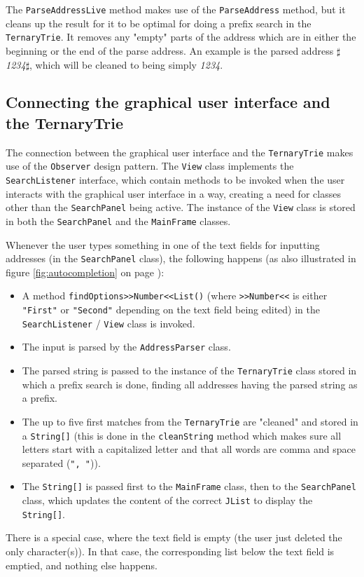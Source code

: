 \documentclass[a4paper,11pt]{article}
\begin{document}
The \texttt{ParseAddressLive} method makes use of the \texttt{ParseAddress} method, but it cleans up the result for it to be optimal for doing a prefix search in the \texttt{TernaryTrie}. It removes any "empty" parts of the address which are in either the beginning or the end of the parse address. An example is the parsed address \textit{$\sharp$1234$\sharp$}, which will be cleaned to being simply \textit{1234}.

\subsection{Connecting the graphical user interface and the TernaryTrie}
The connection between the graphical user interface and the \texttt{TernaryTrie} makes use of the \texttt{Observer} design pattern. The \texttt{View} class implements the \texttt{SearchListener} interface, which contain methods to be invoked when the user interacts with the graphical user interface in a way, creating a need for classes other than the \texttt{SearchPanel} being active. The instance of the \texttt{View} class is stored in both the \texttt{SearchPanel} and the \texttt{MainFrame} classes.

Whenever the user types something in one of the text fields for inputting addresses (in the \texttt{SearchPanel} class), the following happens (as also illustrated in figure \ref{fig:autocompletion} on page \pageref{fig:autocompletion}):
\begin{itemize}
	\item A method \texttt{findOptions>>Number<<List()} (where \texttt{>>Number<<} is either \texttt{"First"} or \texttt{"Second"} depending on the text field being edited) in the \texttt{SearchListener} / \texttt{View} class is invoked.
	\item The input is parsed by the \texttt{AddressParser} class.
	\item The parsed string is passed to the instance of the \texttt{TernaryTrie} class stored in which a prefix search is done, finding all addresses having the parsed string as a prefix.
	\item The up to five first matches from the \texttt{TernaryTrie} are "cleaned" and stored in a \texttt{String[]} (this is done in the \texttt{cleanString} method which makes sure all letters start with a capitalized letter and that all words are comma and space separated (\texttt{", "})).
	\item The \texttt{String[]} is passed first to the \texttt{MainFrame} class, then to the \texttt{SearchPanel} class, which updates the content of the correct \texttt{JList} to display the \texttt{String[]}.
\end{itemize}
There is a special case, where the text field is empty (the user just deleted the only character(s)). In that case, the corresponding list below the text field is emptied, and nothing else happens.
\end{document}
